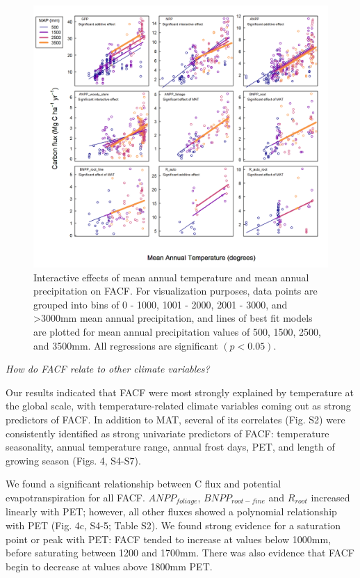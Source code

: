 \documentclass[]{article}
\begin{document}
\begin{figure}[H]
\includegraphics[width=1\linewidth]{mat_map_interaction} \caption{Interactive effects of mean annual temperature and mean annual precipitation on FACF. For visualization purposes, data points are grouped into bins of 0 - 1000, 1001 - 2000, 2001 - 3000, and >3000mm mean annual precipitation, and lines of best fit models are plotted for mean annual precipitation values of 500, 1500, 2500, and 3500mm. All regressions are significant $(p<0.05)$.}\label{fig:unnamed-chunk-8}
\end{figure}

\emph{How do FACF relate to other climate variables?}

Our results indicated that FACF were most strongly explained by
temperature at the global scale, with temperature-related climate
variables coming out as strong predictors of FACF. In addition to MAT,
several of its correlates (Fig. S2) were consistently identified as
strong univariate predictors of FACF: temperature seasonality, annual
temperature range, annual frost days, PET, and length of growing season
(Figs. 4, S4-S7).

We found a significant relationship between C flux and potential
evapotranspiration for all FACF. \(ANPP_{foliage}\),
\(BNPP_{root-fine}\) and \(R_{root}\) increased linearly with PET;
however, all other fluxes showed a polynomial relationship with PET
(Fig. 4c, S4-5; Table S2). We found strong evidence for a saturation
point or peak with PET: FACF tended to increase at values below 1000mm,
before saturating between 1200 and 1700mm. There was also evidence that
FACF begin to decrease at values above 1800mm PET.
\end{document}
